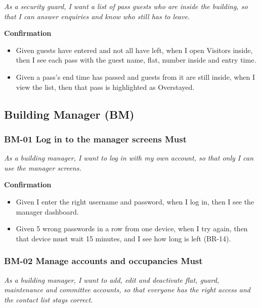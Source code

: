 \documentclass[11pt,a4paper]{report}
\begin{document}
\emph{As a security guard, I want a list of pass guests who are inside the building, so that I can answer enquiries and know who still has to leave.}

\medskip\noindent\textbf{Confirmation}\par

\begin{itemize}
  \item Given guests have entered and not all have left, when I open Visitors inside, then I see each pass with the guest name, flat, number inside and entry time.
  \item Given a pass's end time has passed and guests from it are still inside, when I view the list, then that pass is highlighted as Overstayed.
\end{itemize}

\subsection{Building Manager (BM)}

\subsubsection*{BM-01 \textperiodcentered{} Log in to the manager screens \textperiodcentered{} Must}

\emph{As a building manager, I want to log in with my own account, so that only I can use the manager screens.}

\medskip\noindent\textbf{Confirmation}\par

\begin{itemize}
  \item Given I enter the right username and password, when I log in, then I see the manager dashboard.
  \item Given 5 wrong passwords in a row from one device, when I try again, then that device must wait 15 minutes, and I see how long is left (BR-14).
\end{itemize}

\subsubsection*{BM-02 \textperiodcentered{} Manage accounts and occupancies \textperiodcentered{} Must}

\emph{As a building manager, I want to add, edit and deactivate flat, guard, maintenance and committee accounts, so that everyone has the right access and the contact list stays correct.}
\end{document}
